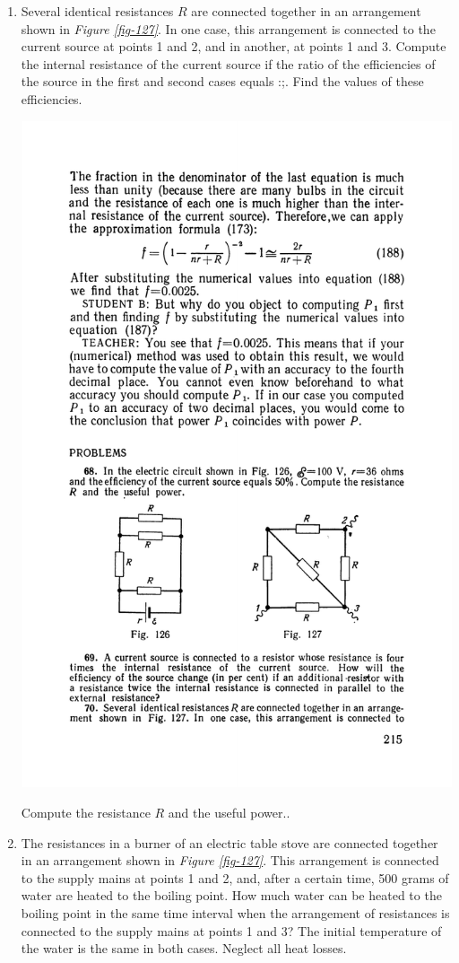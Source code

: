 \documentclass[a4paper,sfsidenotes]{tufte-book}
\begin{document}
\begin{enumerate}[resume=problems]
\item Several identical resistances $R$ are connected together in an arrangement shown in \emph{Figure \ref{fig-127}}. In one case, this arrangement is connected to the current source at points 1 and 2, and in another, at points 1 and 3. Compute the internal resistance of the current source if the ratio of the efficiencies of the source in the first and second cases equals :;. Find the values of these efficiencies.
\begin{marginfigure}%
\centering
\includegraphics[width=.9\linewidth]{fig-127a}
\caption{ Compute the resistance $R$ and the useful power..}
\label{fig-127}
\end{marginfigure}
\item The resistances in a burner of an electric table stove are connected together in an arrangement shown in \emph{Figure \ref{fig-127}}. This arrangement is connected to the supply mains at points 1 and 2, and, after a certain time, 500 grams of water are heated to the boiling point. How much water can be heated to the boiling point in the same time interval when the arrangement of resistances is connected to the supply mains at points 1 and 3? The initial temperature of the water is the same in both cases. Neglect all heat losses.


\end{enumerate}
\end{document}
